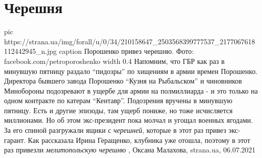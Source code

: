  
 
 
 
 
\chapter{Черешня}

\ifcmt
  pic https://strana.ua/img/forall/u/0/34/210158647_2503568399777537_2177067618112442945_n.jpg
	caption Порошенко привез черешню. Фото: facebook.com/petroporoshenko
	width 0.4
\fi
Напомним, что ГБР как раз в минувшую пятницу раздало \enquote{пидозры} по хищениям в
армии времен Порошенко.  Директора бывшего завода Порошенко \enquote{Кузня на
Рыбальском} и чиновников Минобороны подозревают в ущербе для армии на
полмиллиарда - и это только на одном контракте по катерам \enquote{Кентавр}. Подозрения
вручены в минувшую пятницу.  Есть и другие эпизоды, там ущерб пониже, но тоже
исчисляется миллионами.  Но об этом экс-президент пока молчал и угощал военных
ягодами. За его спиной разгружали ящики с \emph{черешней}, которые в этот раз привез
экс-гарант.  Как рассказала Ирина Геращенко, клубника уже отошла, поэтому в
этот раз привезли \emph{мелитопольскую черешню}
, 
Оксана Малахова, strana.ua, 06.07.2021

